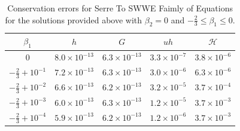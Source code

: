 \documentclass[10pt]{elsarticle}
\newcommand\T{\rule{0pt}{3ex }}       %
\begin{document}
\begin{table}
	\centering
	\begin{tabular}{ c | c | c | c | c }
		$\beta_1$ & $h$ & $G$ & $uh$ & $\mathcal{H}$  \\
		\hline
		\T $0$ &	$8.0 \times 10^{-13}$ &	$6.3 \times 10^{-13}$ & $3.3 \times 10^{-7}$ & $3.8 \times 10^{-6}$ \\
		\T $-\frac{2}{3} + 10^{-1}$ &	$7.2 \times 10^{-13}$ &	$6.3 \times 10^{-13}$ & $3.0 \times 10^{-6}$ & $6.3 \times 10^{-6}$ \\
		\T $-\frac{2}{3} + 10^{-2}$ &	$6.6 \times 10^{-13}$ &	$6.2 \times 10^{-13}$ & $3.2 \times 10^{-5}$ & $3.7 \times 10^{-4}$ \\		
		\T $-\frac{2}{3} + 10^{-3}$ &	$6.0 \times 10^{-13}$ &	$6.3 \times 10^{-13}$ & $1.2 \times 10^{-5}$ & $3.7 \times 10^{-3}$ \\	
		\T $-\frac{2}{3} + 10^{-4}$ &	$5.9 \times 10^{-13}$ &	$6.2 \times 10^{-13}$ & $1.2 \times 10^{-6}$ & $3.7 \times 10^{-3}$ 		
	\end{tabular}
	\caption{Conservation errors for Serre To SWWE Faimly of Equations for the solutions provided above with $\beta_2 = 0$ and $-\frac{2}{3}\le \beta_1 \le 0$.}
\end{table}




\end{document}
